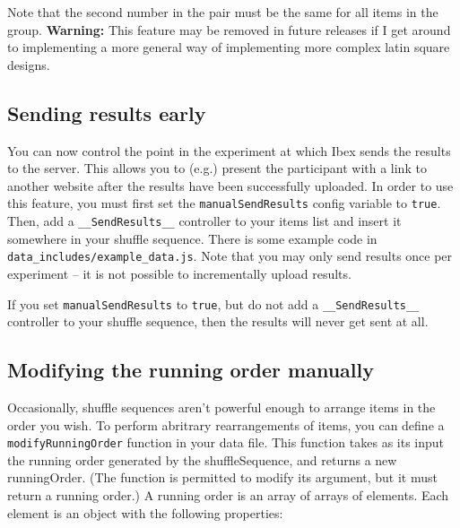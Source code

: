 \documentclass[11pt,letterpaper]{article}
\begin{document}
\smallskip\noindent\normalsize

Note that the second number in the pair must be the same for all items in the group.
\textbf{Warning:} This feature may be removed in future releases if I get around to implementing
a more general way of implementing more complex latin square designs.

\subsection{Sending results early}

You can now control the point in the experiment at which Ibex sends the results to the server.
This allows you to (e.g.) present the participant with a link to another website after the
results have been successfully uploaded. In order to use this feature, you must first set
the \texttt{manualSendResults} config variable to \texttt{true}. Then, add a \texttt{\_\_SendResults\_\_} controller
to your items list and insert it somewhere in your shuffle sequence. There is some example
code in \texttt{data\_includes/example\_data.js}.  Note that you may only
send results once per experiment -- it is not possible to incrementally upload results.

If you set \texttt{manualSendResults} to \texttt{true}, but do not add a \texttt{\_\_SendResults\_\_} controller to
your shuffle sequence, then the results will never get sent at all.

\subsection{Modifying the running order manually}

Occasionally, shuffle sequences aren't powerful enough to arrange
items in the order you wish.  To perform abritrary rearrangements of
items, you can define a \texttt{modifyRunningOrder} function in your data
file. This function takes as its input the running order generated by
the shuffleSequence, and returns a new runningOrder. (The function is
permitted to modify its argument, but it must return a running order.)
A running order is an array of arrays of elements. Each element is an object
with the following properties:
\end{document}

